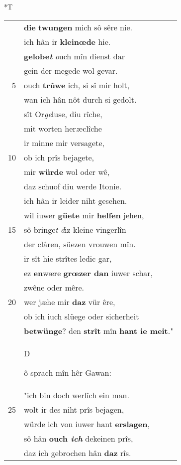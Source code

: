 \documentclass[8pt,a4paper,notitlepage]{article}
\begin{document}
\begin{table}[ht]
\begin{minipage}[t]{0.5\linewidth}
\small
\begin{center}*T
\end{center}
\begin{tabular}{rl}
 & \textbf{die} \textbf{twungen} mich sô sêre nie.\\ 
 & ich hân ir \textbf{kleinœde} hie.\\ 
 & \textbf{gelobe\textit{t}} \textit{o}uch mîn dienst dar\\ 
 & gein der megede wol gevar.\\ 
5 & ouch \textbf{trûwe} ich, si sî mir holt,\\ 
 & wan ich hân nôt durch si gedolt.\\ 
 & sît Or\textit{ge}luse, diu rîche,\\ 
 & mit worten her\textit{z}eclîche\\ 
 & ir minne mir versagete,\\ 
10 & ob ich prîs bejagete,\\ 
 & mir \textbf{würde} wol oder wê,\\ 
 & daz schuof diu werde Itonie.\\ 
 & ich hân ir leider niht gesehen.\\ 
 & wil iuwer \textbf{güete} mir \textbf{helfen} jehen,\\ 
15 & sô bringe\textit{t} \textit{d}iz kleine vingerlîn\\ 
 & der clâren, süezen vrouwen mîn.\\ 
 & ir sît hie strîtes ledic gar,\\ 
 & ez \textbf{en}wære \textbf{grœzer dan} iuwer schar,\\ 
 & zwêne oder mêre.\\ 
20 & wer jæhe mir \textbf{daz} vür êre,\\ 
 & ob ich iuch slüege oder sicherheit\\ 
 & \textbf{betwünge}? den \textbf{strît} mîn \textbf{hant ie meit}."\\ 
 & \begin{large}D\end{large}ô sprach mîn hêr Gawan:\\ 
 & "ich bin doch werlîch ein man.\\ 
25 & wolt ir des niht prîs bejagen,\\ 
 & würde ich von iuwer hant \textbf{erslagen},\\ 
 & sô hân \textbf{ouch \textit{ich}} dekeinen prîs,\\ 
 & daz ich gebrochen hân \textbf{daz} rîs.\\ 

\end{tabular}
\end{minipage}
\end{table}
\end{document}
